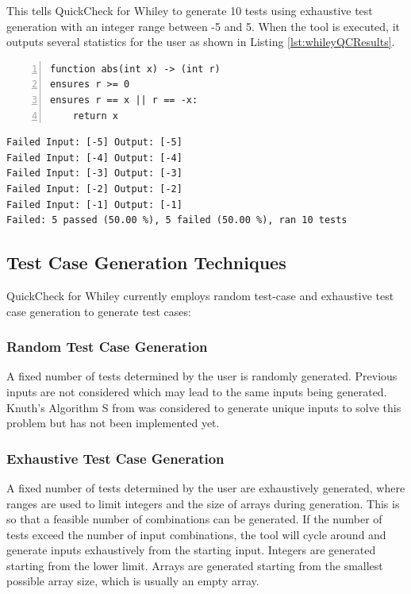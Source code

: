 This tells QuickCheck for Whiley to generate 10 tests using exhaustive test generation with an integer range between -5 and 5. 
When the tool is executed, it outputs several statistics for the user as shown in Listing \ref{lst:whileyQCResults}.

\begin{lstlisting}[language=Whiley, tabsize=3, numbers=left,
label={lst:whileyAbs}, caption={Whiley program for an incorrect implementation of the abs function}]
function abs(int x) -> (int r)
ensures r >= 0
ensures r == x || r == -x:
	return x
\end{lstlisting}

\begin{lstlisting}[label={lst:whileyQCResults},
caption={Results of executing the tool on Listing \ref{lst:whileyAbs}}, ]
Failed Input: [-5] Output: [-5]
Failed Input: [-4] Output: [-4]
Failed Input: [-3] Output: [-3]
Failed Input: [-2] Output: [-2]
Failed Input: [-1] Output: [-1]
Failed: 5 passed (50.00 %), 5 failed (50.00 %), ran 10 tests
\end{lstlisting}

\subsection{Test Case Generation Techniques}

QuickCheck for Whiley currently employs random test-case and exhaustive test case generation to generate test cases: 

\subsubsection{Random Test Case Generation}

A fixed number of tests determined by the user is randomly generated. Previous inputs are not considered which may lead to the same inputs being generated.
Knuth's Algorithm S from \cite{artProgv2} was considered to generate unique inputs to solve this problem but has not been implemented yet.

\subsubsection{Exhaustive Test Case Generation}
A fixed number of tests determined by the user are exhaustively generated, where ranges are used to limit integers and the size of arrays during generation. This is so that a feasible number of combinations can be generated. If the number of tests exceed the number of input combinations, the tool will cycle around and generate inputs exhaustively from the starting input. Integers are generated starting from the lower limit. Arrays are generated starting from the smallest possible array size, which is usually an empty array. 

